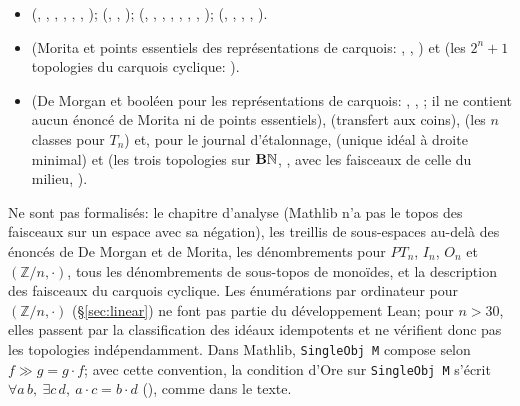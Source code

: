 \begin{itemize}
\item {} (, , , , , , );  (, , );  (, , , , , , , );  (, , , , ).
\item {} (Morita et points essentiels des représentations de carquois: , , ) et  (les $2^n+1$ topologies du carquois cyclique: ).
\item {} (De Morgan et booléen pour les représentations de carquois: , , ; il ne contient aucun énoncé de Morita ni de points essentiels),  (transfert aux coins),  (les $n$ classes pour $T_n$) et, pour le journal d'étalonnage,  (unique idéal à droite minimal) et  (les trois topologies sur $\mathbf{B}\mathbb N$, , avec les faisceaux de celle du milieu, ).
\end{itemize}
Ne sont pas formalisés: le chapitre d'analyse (Mathlib n'a pas le topos des faisceaux sur un espace avec sa négation), les treillis de sous-espaces au-delà des énoncés de De Morgan et de Morita, les dénombrements pour $PT_n$, $I_n$, $O_n$ et $(\mathbb Z/n,\cdot)$, tous les dénombrements de sous-topos de monoïdes, et la description des faisceaux du carquois cyclique. Les énumérations par ordinateur pour $(\mathbb Z/n,\cdot)$ (\S\ref{sec:linear}) ne font pas partie du développement Lean; pour $n>30$, elles passent par la classification des idéaux idempotents et ne vérifient donc pas les topologies indépendamment.
Dans Mathlib, \texttt{SingleObj M} compose selon $f\gg g = g\cdot f$; avec cette convention, la condition d'Ore sur \texttt{SingleObj M} s'écrit $\forall a\,b,\ \exists c\,d,\ a\cdot c = b\cdot d$ (), comme dans le texte.

